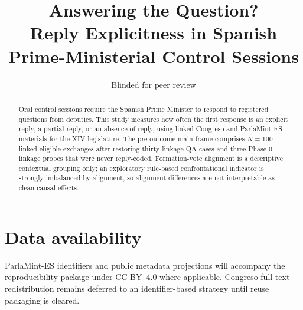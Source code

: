 \documentclass[11pt,a4paper]{article}
\title{Answering the Question?\\
  Reply Explicitness in Spanish Prime-Ministerial Control Sessions}
\author{Blinded for peer review}
\date{}
\begin{document}
\maketitle

\begin{abstract}
Oral control sessions require the Spanish Prime Minister to respond to
registered questions from deputies. This study measures how often the first
response is an explicit reply, a partial reply, or an absence of reply, using
linked Congreso and ParlaMint-ES materials for the XIV legislature. The
pre-outcome main frame comprises $N=100$ linked eligible exchanges after
restoring thirty linkage-QA cases and three Phase-0 linkage probes that were
never reply-coded. Formation-vote alignment is a descriptive contextual
grouping only; an exploratory rule-based confrontational indicator is
strongly imbalanced by alignment, so alignment differences are not
interpretable as clean causal effects.
\end{abstract}








\section*{Data availability}
ParlaMint-ES identifiers and public metadata projections will accompany the
reproducibility package under CC BY~4.0 where applicable. Congreso full-text
redistribution remains deferred to an identifier-based strategy until reuse
packaging is cleared.


\end{document}
